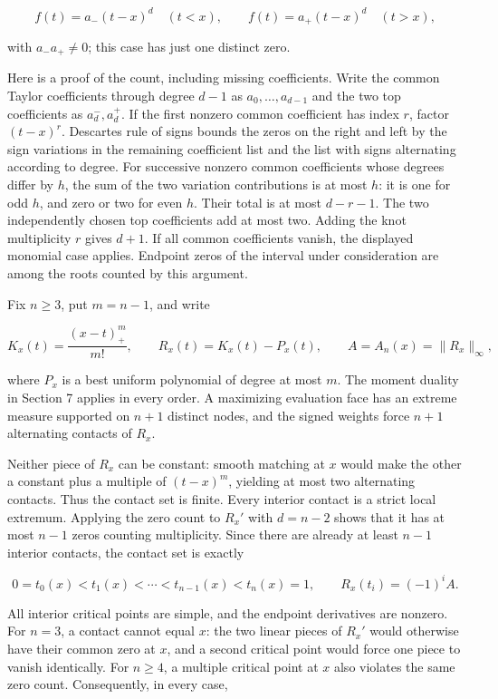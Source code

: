 \documentclass[11pt]{article}
\begin{document}
\[
f(t)=a_-(t-x)^d\quad(t<x),\qquad
f(t)=a_+(t-x)^d\quad(t>x),
\]

with \(a_-a_+\ne0\); this case has just one distinct zero.

Here is a proof of the count, including missing coefficients. Write the
common Taylor coefficients through degree \(d-1\) as
\(a_0,\ldots,a_{d-1}\) and the two top coefficients as \(a_d^-,a_d^+\).
If the first nonzero common coefficient has index \(r\), factor
\((t-x)^r\). Descartes\textquotesingle{} rule of signs bounds the zeros
on the right and left by the sign variations in the remaining
coefficient list and the list with signs alternating according to
degree. For successive nonzero common coefficients whose degrees differ
by \(h\), the sum of the two variation contributions is at most \(h\):
it is one for odd \(h\), and zero or two for even \(h\). Their total is
at most \(d-r-1\). The two independently chosen top coefficients add at
most two. Adding the knot multiplicity \(r\) gives \(d+1\). If all
common coefficients vanish, the displayed monomial case applies.
Endpoint zeros of the interval under consideration are among the roots
counted by this argument.

Fix \(n\ge3\), put \(m=n-1\), and write

\[
K_x(t)=\frac{(x-t)_+^m}{m!},\qquad
R_x(t)=K_x(t)-P_x(t),\qquad
A=A_n(x)=\|R_x\|_\infty,
\tag{8.1}
\]

where \(P_x\) is a best uniform polynomial of degree at most \(m\). The
moment duality in Section 7 applies in every order. A maximizing
evaluation face has an extreme measure supported on \(n+1\) distinct
nodes, and the signed weights force \(n+1\) alternating contacts of
\(R_x\).

Neither piece of \(R_x\) can be constant: smooth matching at \(x\) would
make the other a constant plus a multiple of \((t-x)^m\), yielding at
most two alternating contacts. Thus the contact set is finite. Every
interior contact is a strict local extremum. Applying the zero count to
\(R_x'\) with \(d=n-2\) shows that it has at most \(n-1\) zeros counting
multiplicity. Since there are already at least \(n-1\) interior
contacts, the contact set is exactly

\[
0=t_0(x)<t_1(x)<\cdots<t_{n-1}(x)<t_n(x)=1,
\qquad R_x(t_i)=(-1)^iA.
\tag{8.2}
\]

All interior critical points are simple, and the endpoint derivatives
are nonzero. For \(n=3\), a contact cannot equal \(x\): the two linear
pieces of \(R_x'\) would otherwise have their common zero at \(x\), and
a second critical point would force one piece to vanish identically. For
\(n\ge4\), a multiple critical point at \(x\) also violates the same
zero count. Consequently, in every case,
\end{document}

